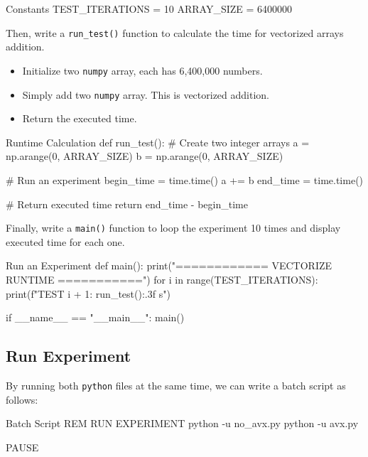 \documentclass[12pt, a4paper]{article}
\begin{document}
            \begin{codeblock}[minted language=c]{Constants}
                TEST_ITERATIONS = 10
                ARRAY_SIZE = 6400000
            \end{codeblock}

            Then, write a \texttt{run\_test()} function to calculate the time for vectorized arrays addition.
            \begin{itemize}
                \item Initialize two \texttt{numpy} array, each has 6,400,000 numbers.
                \item Simply add two \texttt{numpy} array. This is vectorized addition.
                \item Return the executed time.
            \end{itemize}

            \begin{codeblock}{Runtime Calculation}
                def run_test():
                    # Create two integer arrays
                    a = np.arange(0, ARRAY_SIZE)
                    b = np.arange(0, ARRAY_SIZE)

                    # Run an experiment
                    begin_time = time.time()
                    a += b
                    end_time = time.time()

                    # Return executed time
                    return end_time - begin_time
            \end{codeblock}

    \pagebreak

            Finally, write a \texttt{main()} function to loop the experiment 10 times and display executed time for each one.
            \begin{codeblock}{Run an Experiment}
                def main():
                    print("============ VECTORIZE RUNTIME ===========")
                    for i in range(TEST_ITERATIONS):
                        print(f"TEST {i + 1}: {run_test():.3f} s")

                if __name__ == "__main__":
                    main()
            \end{codeblock}

    \pagebreak

        \subsection{Run Experiment}
            By running both \texttt{python} files at the same time, we can write a batch script as follows:
            \begin{codeblock}[minted language=bat]{Batch Script}
                REM RUN EXPERIMENT
                python -u no_avx.py
                python -u avx.py

                PAUSE
            \end{codeblock}
\end{document}

